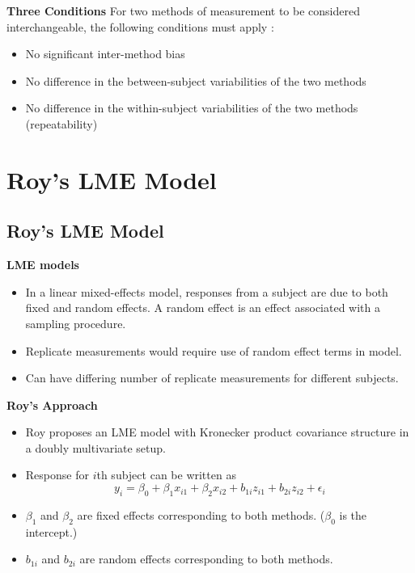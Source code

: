 \documentclass[compress]{beamer}        %
\makeatletter
\newcommand{\tcb}{\textcolor{beamer@blendedblue}}
\makeatother
\begin{document}

\begin{frame}{\bf \tcb{Three Conditions}}
For two methods of measurement to be considered interchangeable, the following conditions must apply \cite{Roy2009}:
\\
\begin{itemize}\itemsep0.5cm
\item No significant inter-method bias
\item No difference in the between-subject variabilities of the two methods
\item No difference in the within-subject variabilities of the two methods (repeatability)
\end{itemize}
\end{frame}

\section[Roy's LME Model]{Roy's LME Model}
\subsection{Roy's LME Model}
\begin{frame}{\bf \tcb{LME models}}
\begin{itemize}\itemsep0.7cm
\item In a linear mixed-effects model, responses from a subject are due to both fixed and random
effects. A random effect is an effect associated with a sampling procedure.
\item Replicate measurements would require use of random effect terms in model.
\item Can have differing number of replicate measurements for different subjects.
\end{itemize}
\end{frame}
\begin{frame}{\bf \tcb{Roy's Approach}}
\begin{itemize}\itemsep0.7cm
\item Roy proposes an LME model with Kronecker product covariance structure in a doubly multivariate setup.
\item Response for $i$th subject can be written as
\[ y_i = \beta_0 + \beta_1x_{i1} + \beta_2x_{i2} + b_{1i}z_{i1}  + b_{2i}z_{i2} + \epsilon_i \]
\item $\beta_1$ and $\beta_2$ are fixed effects corresponding to both methods. ($\beta_0$ is the intercept.)
\item $b_{1i}$ and $b_{2i}$ are random effects corresponding to both methods.
\end{itemize}
\end{frame}
\end{document}
